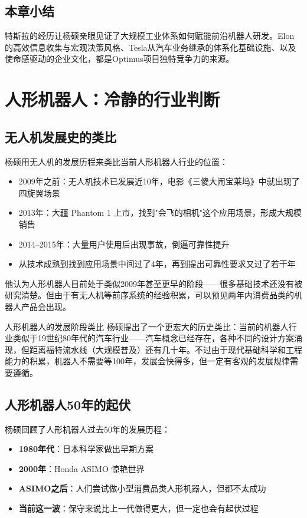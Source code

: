 \documentclass[a4paper]{article}
\begin{document}
\subsection{本章小结}

特斯拉的经历让杨硕亲眼见证了大规模工业体系如何赋能前沿机器人研发。Elon的高效信息收集与宏观决策风格、Tesla从汽车业务继承的体系化基础设施、以及使命感驱动的企业文化，都是Optimus项目独特竞争力的来源。


\section{人形机器人：冷静的行业判断}

\subsection{无人机发展史的类比}

杨硕用无人机的发展历程来类比当前人形机器人行业的位置：

\begin{itemize}
    \item 2009年之前：无人机技术已发展近10年，电影《三傻大闹宝莱坞》中就出现了四旋翼场景
    \item 2013年：大疆 Phantom 1 上市，找到"会飞的相机"这个应用场景，形成大规模销售
    \item 2014--2015年：大量用户使用后出现事故，倒逼可靠性提升
    \item 从技术成熟到找到应用场景中间过了4年，再到提出可靠性要求又过了若干年
\end{itemize}

他认为人形机器人目前处于类似2009年甚至更早的阶段——很多基础技术还没有被研究清楚。但由于有无人机等前序系统的经验积累，可以预见两年内消费品类的机器人产品会出现。

\begin{importantbox}{人形机器人的发展阶段类比}
杨硕提出了一个更宏大的历史类比：当前的机器人行业类似于19世纪80年代的汽车行业——汽车概念已经存在，各种不同的设计方案涌现，但距离福特流水线（大规模普及）还有几十年。不过由于现代基础科学和工程能力的积累，机器人不需要等100年，发展会快得多，但一定有客观的发展规律需要遵循。
\end{importantbox}

\subsection{人形机器人50年的起伏}

杨硕回顾了人形机器人过去50年的发展历程：
\begin{itemize}
    \item \textbf{1980年代}：日本科学家做出早期方案
    \item \textbf{2000年}：Honda ASIMO 惊艳世界
    \item \textbf{ASIMO之后}：人们尝试做小型消费品类人形机器人，但都不太成功
    \item \textbf{当前这一波}：保守来说比上一代做得更大，但一定也会有起伏过程
\end{itemize}
\end{document}
